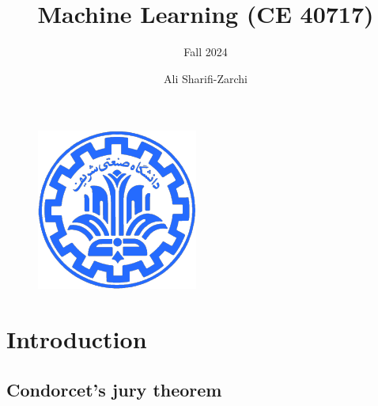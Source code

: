 \documentclass[serif, aspectratio=169]{beamer}
\author{Ali Sharifi-Zarchi}
\title{Machine Learning (CE 40717)}
\subtitle{Fall 2024}
\institute{
    CE Department \\
    Sharif University of Technology
}
\begin{document}
\begin{frame}
    \titlepage
    \vspace*{-0.6cm}
    \begin{figure}[htpb]
        \begin{center}
            \includegraphics[keepaspectratio, scale=0.25]{pic/sharif-main-logo.png}
        \end{center}
    \end{figure}
\end{frame}

\begin{frame}    
    \tableofcontents[sectionstyle=show,
    subsectionstyle=show/shaded/hide,
    subsubsectionstyle=show/shaded/hide]
\end{frame}

\section{Introduction}

\subsection{Condorcet's jury theorem}
\end{document}
